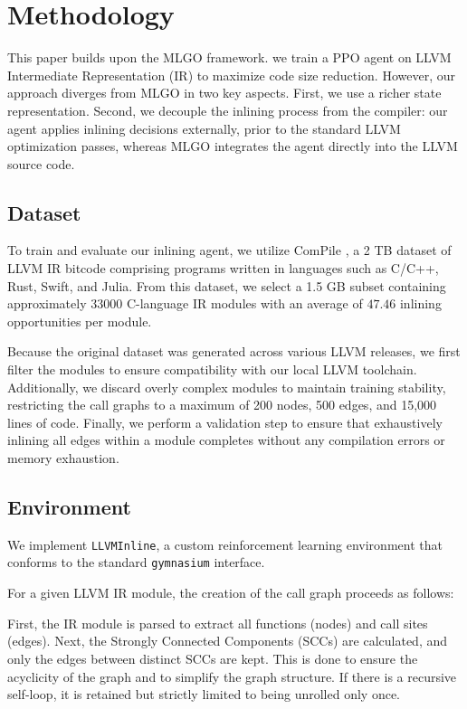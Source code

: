 \documentclass{article}
\theoremstyle{plain}
\theoremstyle{definition}
\theoremstyle{remark}
\begin{document}
\section{Methodology}

This paper builds upon the MLGO framework. we train a PPO agent on LLVM Intermediate Representation (IR) to maximize code size reduction. However, our approach diverges from MLGO in two key aspects. First, we use a richer state representation. Second, we decouple the inlining process from the compiler: our agent applies inlining decisions externally, prior to the standard LLVM optimization passes, whereas MLGO integrates the agent directly into the LLVM source code.

\subsection{Dataset}

To train and evaluate our inlining agent, we utilize ComPile \cite{compile}, a 2 TB dataset of LLVM IR bitcode comprising programs written in languages such as C/C++, Rust, Swift, and Julia. From this dataset, we select a 1.5 GB subset containing approximately 33000 C-language IR modules with an average of $47.46$ inlining opportunities per module.

Because the original dataset was generated across various LLVM releases, we first filter the modules to ensure compatibility with our local LLVM toolchain. Additionally, we discard overly complex modules to maintain training stability, restricting the call graphs to a maximum of 200 nodes, 500 edges, and 15,000 lines of code. Finally, we perform a validation step to ensure that exhaustively inlining all edges within a module completes without any compilation errors or memory exhaustion.

\subsection{Environment}

We implement \verb|LLVMInline|, a custom reinforcement learning environment that conforms to the standard \verb|gymnasium| interface.

For a given LLVM IR module, the creation of the call graph proceeds as follows:

First, the IR module is parsed to extract all functions (nodes) and call sites (edges). Next, the Strongly Connected Components (SCCs) are calculated, and only the edges between distinct SCCs are kept. This is done to ensure the acyclicity of the graph and to simplify the graph structure. If there is a recursive self-loop, it is retained but strictly limited to being unrolled only once.
\end{document}
